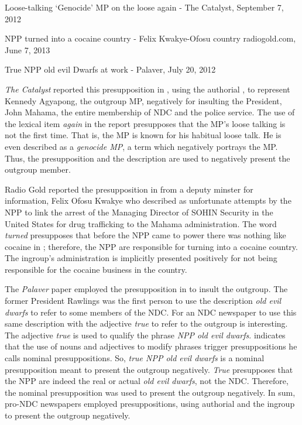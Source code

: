 \documentclass[output=paper,modfonts]{langscibook}
\begin{document}
\ea \label{ex:ofori:12}
\textup{Loose-talking ‘Genocide’ MP on the loose again} - The Catalyst, September 7, 2012\z

\ea \label{ex:ofori:13}
\textup{NPP turned  into a cocaine country} - Felix Kwakye-Ofosu country radiogold.com, June 7, 2013\z

\ea \label{ex:ofori:14}
\textup{True NPP old evil Dwarfs at work} -  Palaver, July 20, 2012\z

\textit{The Catalyst} reported this presupposition in , using the authorial , to represent Kennedy Agyapong, the outgroup MP, negatively for insulting the President, John Mahama, the entire membership of NDC and the police service. The use of the lexical item \textit{again} in the report presupposes that the MP’s loose talking is not the first time. That is, the MP is known for his habitual loose talk. He is even described as a \textit{genocide MP}, a term which negatively portrays the MP. Thus, the presupposition and the description are used to negatively present the outgroup member. 

Radio Gold reported the presupposition in  from a deputy minster for information, Felix Ofosu Kwakye who described as unfortunate attempts by the NPP to link the arrest of the Managing Director of SOHIN Security in the United States for drug trafficking to the Mahama administration. The word \textit{turned} presupposes that before the NPP came to power there was nothing like cocaine in ; therefore, the NPP are responsible for turning  into a cocaine country. The ingroup’s administration is implicitly presented positively for not being responsible for the cocaine business in the country. 

The \textit{ Palaver} paper employed the presupposition in  to insult the outgroup. The former President Rawlings was the first person to use the description \textit{old evil} \textit{dwarfs} to refer to some members of the NDC. For an NDC newspaper to use this same description with the adjective \textit{true} to refer to the outgroup is interesting. The adjective \textit{true} is used to qualify the  phrase \textit{NPP old evil dwarfs}. \citet{Richardson2007} indicates that the use of nouns and adjectives to modify  phrases trigger presuppositions he calls nominal presuppositions. So, \textit{true NPP old evil dwarfs} is a nominal presupposition meant to present the outgroup negatively. \textit{True} presupposes that the NPP are indeed the real or actual \textit{old evil dwarfs},\textit{} not the NDC. Therefore, the nominal presupposition was used to present the outgroup negatively. In sum, pro-NDC newspapers employed presuppositions, using authorial  and the ingroup to present the outgroup negatively.
\end{document}
